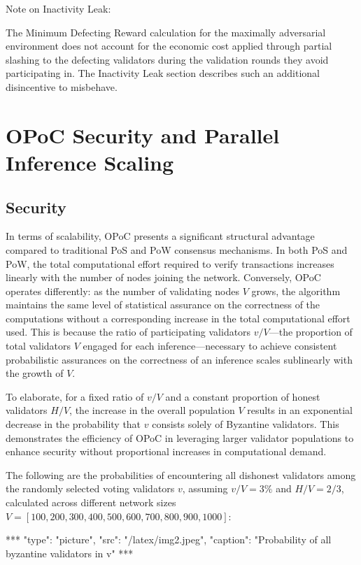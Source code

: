 \documentclass{article}
\begin{document}
Note on Inactivity Leak:

The Minimum Defecting Reward calculation for the maximally adversarial environment does not account for the economic cost applied through partial slashing to the defecting validators during the validation rounds they avoid participating in. The Inactivity Leak section describes such an additional disincentive to misbehave.


\section{OPoC Security and Parallel Inference Scaling }

\subsection{Security}

In terms of scalability, OPoC presents a significant structural advantage compared to traditional PoS and PoW consensus mechanisms. In both PoS and PoW, the total computational effort required to verify transactions increases linearly with the number of nodes joining the network. Conversely, OPoC operates differently: as the number of validating nodes \(V\) grows, the algorithm maintains the same level of statistical assurance on the correctness of the computations without a corresponding increase in the total computational effort used. This is because the ratio of participating validators \(v/V\)—the proportion of total validators \(V\) engaged for each inference—necessary to achieve consistent probabilistic assurances on the correctness of an inference scales sublinearly with the growth of \(V\). 

To elaborate, for a fixed ratio of \(v/V\) and a constant proportion of honest validators \(H/V\), the increase in the overall population \(V\) results in an exponential decrease in the probability that \(v\) consists solely of Byzantine validators. This demonstrates the efficiency of OPoC in leveraging larger validator populations to enhance security without proportional increases in computational demand.

The following are the probabilities of encountering all dishonest validators among the randomly selected voting validators \(v\), assuming \(v/V = 3\%\) and \(H/V = 2/3\), calculated across different network sizes \(V = [100,200,300,400,500,600,700,800,900,1000]\):


***
"type": "picture",
"src": "/latex/img2.jpeg",
"caption": "Probability of all byzantine validators in v"
***
\end{document}
